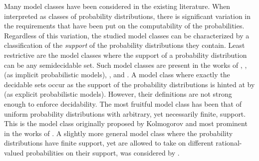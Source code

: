Many model classes have been considered in the existing literature.
When interpreted as classes of probability distributions, there is significant variation in the requirements that have been put on the computability of the probabilities.
Regardless of this variation, the studied model classes can be characterized by a classification of the \emph{support} of the probability distributions they contain.
Least restrictive are the model classes where the support of a probability distribution can be any semidecidable set.
Such model classes are present in the works of \textcite{rissanen1983universal}, \textcite{koppel1988structure}, \textcite{gacs2001algorithmic} (as implicit probabilistic models), \textcite{vitanyi2006meaningful}, and \textcite{antunes2009sophistication}.
A model class where exactly the decidable sets occur as the support of the probability distributions is hinted at by \textcite{gacs2001algorithmic} (as explicit probabilistic models).
However, their definitions are not strong enough to enforce decidability.
The most fruitful model class has been that of uniform probability distributions with arbitrary, yet necessarily finite, support.
This is the model class originally proposed by Kolmogorov and most prominent in the works of \textcite{gacs2001algorithmic,vereshchagin2004kolmogorov}.
A slightly more general model class where the probability distributions have finite support, yet are allowed to take on different rational-valued probabilities on their support, was considered by \textcite{vereshchagin2017algorithmic}.

